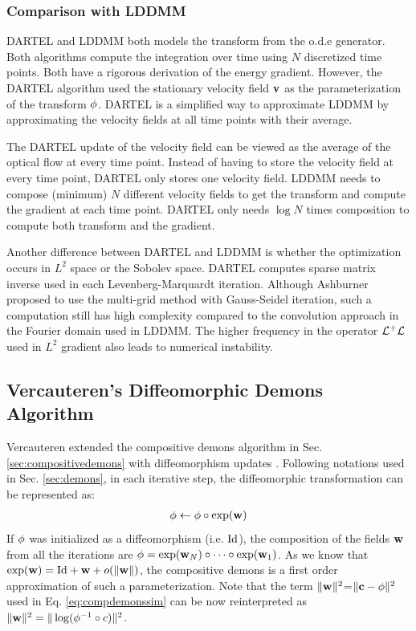 \documentclass[letterpaper,12pt]{article}
\begin{document}
\subsubsection{Comparison with LDDMM}

DARTEL and LDDMM both models the transform from the o.d.e generator. Both algorithms compute the integration over time using $N$ discretized time points. Both have a rigorous derivation of the energy gradient. 
However, the DARTEL algorithm used the stationary velocity field $\mathbf{v}$
as the parameterization of the transform $\phi$. DARTEL is a simplified way to approximate LDDMM by approximating the velocity fields at all time points with their average.

The DARTEL update of the velocity field can be viewed as the average
of the optical flow at every time point. Instead of having to store
the velocity field at every time point, DARTEL only stores one
velocity field. LDDMM needs to compose (minimum) $N$ different velocity fields to get the transform and compute the gradient at each time point. DARTEL only needs $\log N$ times composition to compute both transform and the gradient. 

Another difference between DARTEL and LDDMM is whether the
optimization occurs in $L^2$ space or the Sobolev space. DARTEL
computes sparse matrix inverse used in each Levenberg-Marquardt
iteration. Although Ashburner proposed to use the multi-grid method with
Gauss-Seidel iteration, such a computation still has high complexity compared to the convolution approach in the Fourier domain used in LDDMM. The higher frequency in the operator $\mathcal{L}^+\mathcal{L}$ used in $L^2$ gradient also leads to numerical instability.



\subsection{Vercauteren's Diffeomorphic Demons Algorithm}

Vercauteren extended the compositive demons algorithm in Sec. \ref{sec:compositivedemons} with diffeomorphism updates \cite{Vercauteren2009}. Following notations used in Sec. \ref{sec:demons}, in each iterative step, the diffeomorphic transformation can be represented as:
\begin{align}
\phi \leftarrow \phi \circ \exp(\mathbf{w})
\end{align}
If $\phi$ was initialized as a diffeomorphism (i.e. $\text{Id}$), the composition of the fields $\mathbf{w}$ from all the iterations are $\phi = \exp(\mathbf{w}_N) \circ \cdots \circ \exp(\mathbf{w}_1)$. As we know that $\exp(\mathbf{w}) = \text{Id} + \mathbf{w} + o(\|\mathbf{w}\|)$, the compositive demons is a first order approximation of such a parameterization. 
Note that the term $\|\mathbf{w}\|^2$=$\|\mathbf{c}-\phi\|^2$ used in Eq. \ref{eq:compdemonssim} can be now reinterpreted as $\| \mathbf{w} \|^2 = \| \log(\phi^{-1} \circ c )\|^2$.
\end{document}
